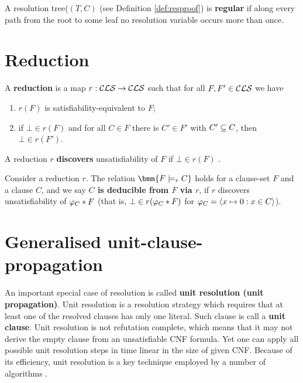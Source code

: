 \documentclass[12pt]{book}
\begin{document}
\begin{defi}\label{def:regres}
  A resolution tree($(T,C)$ (see Definition \ref{def:resproof}) is \textbf{regular} if along every path from the root to some leaf no resolution variable occurs more than once.
\end{defi}
\section{Reduction}
\label{sec:Reduction}
\begin{defi}\label{def:red}
   A \textbf{reduction} is a map $r: \mathcal{CLS} \rightarrow \mathcal{CLS}$ such that for all $F, F' \in \mathcal{CLS}$ we have
  \begin{enumerate}
  \item $r(F)$ is satisfiability-equivalent to $F$;
  \item if $\bot \in r(F)$ and for all $C \in F$ there is $C' \in  F'$ with $C' \subseteq C$, then $\bot \in r(F')$.
  \end{enumerate}
  A reduction $r$ \textbf{discovers} unsatisfiability of $F$ if $\bot \in r(F)$ \cite{h10}.
\end{defi}

\begin{defi}\label{def:implication}
  Consider a reduction $r$. The relation $\bmm{F \models_r C}$ holds for a clause-set $F$ and a clause $C$, and we say \textbf{$C$ is deducible from $F$ via $r$}, if $r$ 
  discovers unsatisfiability of $\varphi_C * F$ (that is, $\bot \in r(\varphi_C * F)$ for $\varphi_C = \langle x \mapsto 0 : x \in C \rangle$).
\end{defi}
\section{Generalised unit-clause-propagation}
\label{sec:rkred}

An important special case of resolution is called \textbf{unit resolution (unit propagation)}. Unit resolution is a resolution strategy 
which requires that at least one of the resolved clauses has only one literal. Such clause is call a \textbf{unit clause}. Unit resolution 
is not refutation complete, which means that it may not derive the empty clause from an unsatisfiable CNF formula. Yet one can apply all 
possible unit resolution steps in time linear in the size of given CNF. Because of its efficiency, unit resolution is a key technique 
employed by a number of algorithms \cite{h6}.
\end{document}
